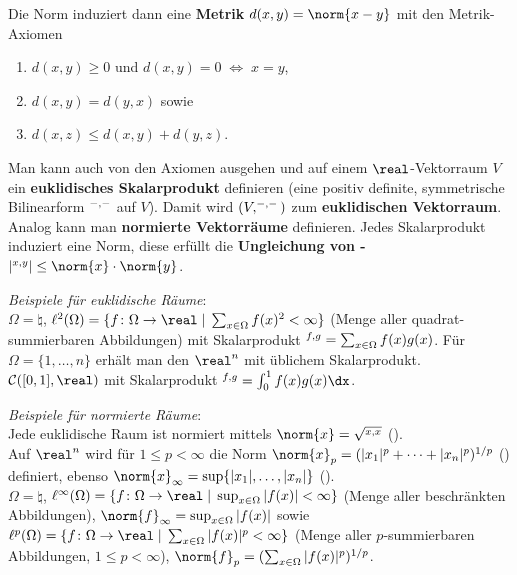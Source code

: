 Die Norm induziert dann eine \textbf{Metrik} $d(x, y) = \norm{x - y}$ mit den
Metrik-Axiomen
\begin{enumerate}[label=(M\arabic*)]
    \item
    $d(x, y) \ge 0$ und $d(x, y) = 0 \;\Leftrightarrow\; x = y$,
    
    \item
    $d(x, y) = d(y, x)$ sowie
    
    \item
    $d(x, z) \le d(x, y) + d(y, z)$.
\end{enumerate}

Man kann auch von den Axiomen ausgehen und auf einem $\real$-Vektorraum $V$ ein
\textbf{euklidisches Skalarprodukt} definieren
(eine positiv definite, symmetrische Bilinearform $\sp{-, -}$ auf $V$).
Damit wird $(V, \sp{-, -})$ zum \textbf{euklidischen Vektorraum}. \\
Analog kann man \textbf{normierte Vektorräume} definieren. Jedes Skalarprodukt
induziert eine Norm, diese erfüllt die
\textbf{Ungleichung von -}
$|\sp{x, y}| \le \norm{x} \cdot \norm{y}$.

\emph{Beispiele für euklidische Räume}: \\
$\Omega = \natural$,
$\ell^2(\Omega) = \{f\colon \Omega \rightarrow \real \;|\;
\sum_{x \in \Omega} f(x)^2 < \infty\}$
(Menge aller quadrat-summierbaren Abbildungen)
mit Skalarprodukt
$\sp{f, g} = \sum_{x \in \Omega} f(x)g(x)$.
Für $\Omega = \{1, \dotsc, n\}$ erhält man den
$\real^n$ mit üblichem Skalarprodukt. \\
$\C([0,1], \real)$ mit Skalarprodukt $\sp{f, g} = \int_0^1 f(x)g(x)\dx$.

\emph{Beispiele für normierte Räume}: \\
Jede euklidische Raum ist normiert mittels $\norm{x} = \sqrt{\sp{x, x}}$
(). \\
Auf $\real^n$ wird für $1 \le p < \infty$ die Norm
$\norm{x}_p = (|x_1|^p + \dotsb + |x_n|^p)^{1/p}$ ()
definiert, ebenso $\norm{x}_\infty = \sup\{|x_1|, \dotsc, |x_n|\}$
(). \\
$\Omega = \natural$,
$\ell^\infty(\Omega) = \{f\colon \Omega \rightarrow \real \;|\;
\sup_{x \in \Omega} |f(x)| < \infty\}$
(Menge aller beschränkten Abbildungen),
$\norm{f}_\infty = \sup_{x \in \Omega} |f(x)|$ sowie
$\ell^p(\Omega) = \{f\colon \Omega \rightarrow \real \;|\;
\sum_{x \in \Omega} |f(x)|^p < \infty\}$
(Menge aller $p$-summierbaren Abbildungen, $1 \le p < \infty$),
$\norm{f}_p = (\sum_{x \in \Omega} |f(x)|^p)^{1/p}$.

